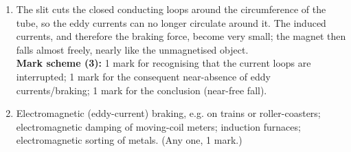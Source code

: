 \documentclass[11pt]{article}
\begin{document}
\begin{corrige}
\begin{enumerate}
\item[(d)] The slit cuts the closed conducting loops around the circumference of the tube, so the eddy currents can no longer circulate around it. The induced currents, and therefore the braking force, become very small; the magnet then falls almost freely, nearly like the unmagnetised object.\\
\textbf{Mark scheme (3):} 1 mark for recognising that the current loops are interrupted; 1 mark for the consequent near-absence of eddy currents/braking; 1 mark for the conclusion (near-free fall).
\item[(e)] Electromagnetic (eddy-current) braking, e.g. on trains or roller-coasters; electromagnetic damping of moving-coil meters; induction furnaces; electromagnetic sorting of metals. (Any one, 1 mark.)
\end{enumerate}
\end{corrige}
\end{document}
